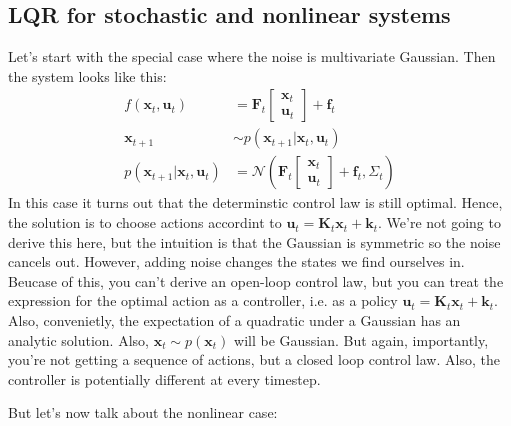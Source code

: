 \documentclass{report}
\begin{document}
\subsection{LQR for stochastic and nonlinear systems}
Let's start with the special case where the noise is multivariate Gaussian.
Then the system looks like this:
\begin{align}
f (\bm{x}_{t}, \bm{u}_{t} ) &= \bm{F}_{t} \begin{bmatrix} \bm{x}_{t} \\ \bm{u}_{t} \end{bmatrix} + \bm{f}_{t} \\
\bm{x}_{t+1} &\sim p (\bm{x}_{t+1}| \bm{x}_{t}, \bm{u}_{t}) \\
p (\bm{x}_{t+1}| \bm{x}_{t}, \bm{u}_{t}) &= 
\mathcal{N} \left( \bm{F}_{t} \begin{bmatrix} \bm{x}_{t} \\ \bm{u}_{t} \end{bmatrix} + \bm{f}_{t}, \Sigma_{ t }  \right) 
\end{align}
In this case it turns out that the determinstic control law is still optimal.
Hence, the solution is to choose actions accordint to $ \bm{u}_{t} = \bm{K}_{t}\bm{x}_{t} + \bm{k}_{t}  $.
We're not going to derive this here, 
but the intuition is that the Gaussian is symmetric so the noise cancels out.
However, adding noise changes the states we find ourselves in.
Beucase of this, you can't derive an open-loop control law, but you can treat
the expression for the optimal action as a controller, i.e. as a policy $ \bm{u}_{t} = \bm{K}_{t}\bm{x}_{t} + \bm{k}_{t}  $.
Also, convenietly, the expectation of a quadratic under a Gaussian has an analytic solution.
Also, $ \bm{x}_{t} \sim p (\bm{x}_{t})  $ will be Gaussian.
But again, importantly, you're not getting a sequence of actions, but a closed loop control law.
Also, the controller is potentially different at every timestep.

But let's now talk about the nonlinear case:
\end{document}
